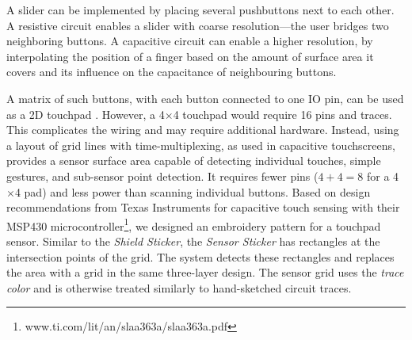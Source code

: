 \documentclass[header.tex]{subfiles}
\begin{document}

A slider can be implemented by placing several pushbuttons next to each other. A resistive circuit enables a slider with coarse resolution---the user bridges two neighboring buttons. A capacitive circuit can enable a higher resolution, by interpolating the position of a finger based on the amount of surface area it covers and its influence on the capacitance of neighbouring buttons.


A matrix of such buttons, with each button connected to one IO pin, can be used as a 2D touchpad \cite{hamdan2016grabrics,5387040}. 
However, a 4$\times$4 touchpad would require 16 pins and traces. This complicates the wiring and may require additional hardware. Instead, using a layout of grid lines with time-multiplexing, as used in capacitive touchscreens, provides a sensor surface area capable of detecting individual touches, simple gestures, and sub-sensor point detection. It requires fewer pins ($4+4=8$ for a 4$\times$4 pad) and less power than scanning individual buttons. 
Based on design recommendations from Texas Instruments for capacitive touch sensing with their MSP430 microcontroller\footnote{ www.ti.com/lit/an/slaa363a/slaa363a.pdf}, we designed an embroidery pattern for a touchpad sensor. Similar to the \textit{Shield Sticker}, the \textit{Sensor Sticker} has rectangles at the intersection points of the grid. The system detects these rectangles and replaces the area with a grid in the same three-layer design. The sensor grid uses the \textit{trace color} and is otherwise treated similarly to hand-sketched circuit traces.
\end{document}
